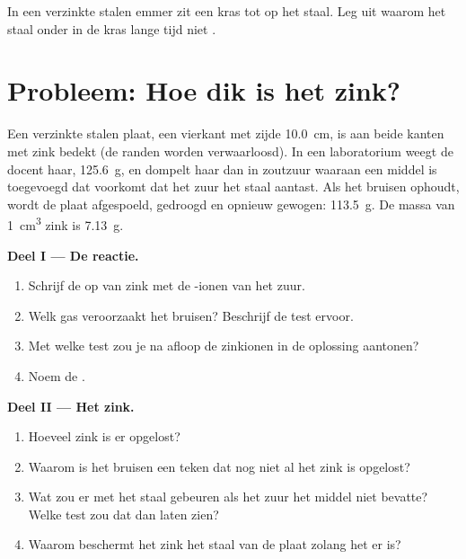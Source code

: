 \begin{exercise}[$\star\star\star$]\label{exo:g9:metals-acids-corrosion:12}
In een verzinkte stalen emmer zit een kras tot op het staal. Leg uit
waarom het staal onder in de kras lange tijd niet .
\end{exercise}

\section{Probleem: Hoe dik is het zink?}

\begin{problem}
\label{pb:g9:metals-acids-corrosion:1}
Een verzinkte stalen plaat, een vierkant met zijde \qty{10.0}{cm}, is
aan beide kanten met zink bedekt (de randen worden verwaarloosd). In een
laboratorium weegt de docent haar, \qty{125.6}{g}, en dompelt haar dan in
zoutzuur waaraan een middel is toegevoegd dat voorkomt dat het zuur het
staal aantast. Als het bruisen ophoudt, wordt de plaat afgespoeld,
gedroogd en opnieuw gewogen: \qty{113.5}{g}. De massa van \qty{1}{cm^3}
zink is \qty{7.13}{g}.

\medskip
\noindent\textbf{Deel I --- De reactie.}
\begin{enumerate}
  \item Schrijf de  op van zink met de -ionen
        van het zuur.
  \item Welk gas veroorzaakt het bruisen? Beschrijf de test ervoor.
  \item Met welke test zou je na afloop de zinkionen in de oplossing
        aantonen?
  \item Noem de .
\end{enumerate}

\medskip
\noindent\textbf{Deel II --- Het zink.}
\begin{enumerate}[resume]
  \item Hoeveel zink is er opgelost?
  \item Waarom is het bruisen een teken dat nog niet al het zink is
        opgelost?
  \item Wat zou er met het staal gebeuren als het zuur het middel niet
        bevatte? Welke test zou dat dan laten zien?
  \item Waarom beschermt het zink het staal van de plaat zolang het er
        is?
\end{enumerate}


\end{problem}
